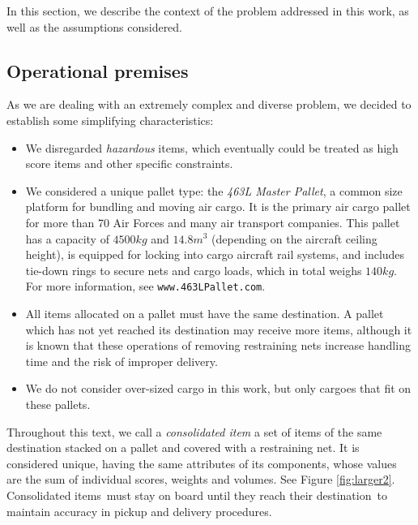 \documentclass[preprint,authoryear]{elsarticle}
\begin{document}
In this section, we describe the context of the problem addressed in this work, as well as the assumptions considered.

\subsection{Operational premises}

As we are dealing with an extremely complex and diverse problem, we decided to establish some simplifying characteristics:

\begin{itemize}
		
	\item We disregarded {\it hazardous} items, which eventually could be treated as high score items and other specific constraints.
	
	\item We considered a unique pallet type: the {\it 463L Master Pallet}, a common size platform for bundling and moving air cargo. It is the primary air cargo pallet for more than 70 Air Forces and many air transport companies. This pallet has a capacity of $4500 kg$ and $14.8 m^3$ (depending on the aircraft ceiling height), is equipped for locking into cargo aircraft rail systems, and includes tie-down rings to secure nets and cargo loads, which in total weighs $140 kg$. For more information, see {\tt www.463LPallet.com}.
	
	\item All items allocated on a pallet must have the same destination. A pallet which has not yet reached its destination may receive more items, although it is known that these operations of removing restraining nets increase handling time and the risk of improper delivery.
	
	\item We do not consider over-sized cargo in this work, but only cargoes that fit on these pallets.
	
\end{itemize}

Throughout this text, we call a {\it consolidated item} a set of items of the same destination stacked on a pallet and covered with a restraining net. It is considered unique, having the same attributes of its components, whose values are the sum of individual scores, weights and volumes. See Figure \ref{fig:larger2}.
Consolidated items must stay on board until they reach their destination to maintain accuracy in pickup and delivery procedures.
\end{document}
